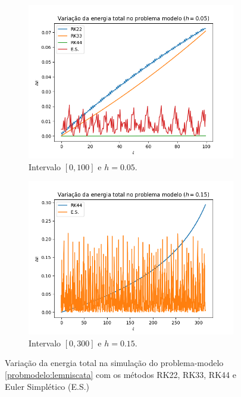 \begin{figure}
    \centering
    \begin{subfigure}{.5\textwidth}
      \centering
      \includegraphics[width=\linewidth]{tcc/img/var_energia_rk22_rk33_rk44_es.png}
      \caption{Intervalo $[0,100]$ e $h=0.05$.}
      \label{fig:var_energia_rk22_rk33_rk44_es_a}
    \end{subfigure}%
    \begin{subfigure}{.5\textwidth}
      \centering
      \includegraphics[width=\linewidth]{tcc/img/var_energia_rk44_es.png}
      \caption{Intervalo $[0,300]$ e $h=0.15$.}
      \label{fig:var_energia_rk22_rk33_rk44_es_b}
    \end{subfigure}
    \caption{Variação da energia total na simulação do problema-modelo \ref{probmodelo:lemniscata} com os métodos RK22, RK33, RK44 e Euler Simplético (E.S.)}
    \label{fig:var_energia_rk22_rk33_rk44_es}
\end{figure}

